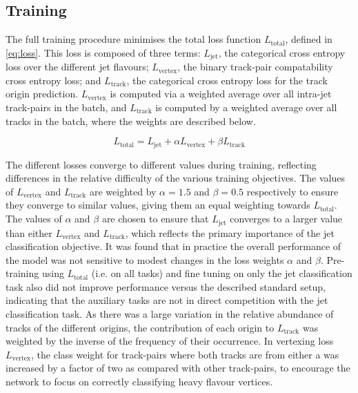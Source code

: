 \subsection{Training}\label{sec:training}

The full \GNN training procedure minimises the total loss function $L_\text{total}$, defined in \cref{eq:loss}. 
This loss is composed of three terms: $L_\text{jet}$, the categorical cross entropy loss over the different jet flavours; $L_\text{vertex}$, the binary track-pair compatability cross entropy loss; and $L_\text{track}$, the categorical cross entropy loss for the track origin prediction.
$L_\text{vertex}$ is computed via a weighted average over all intra-jet track-pairs in the batch, and $L_\text{track}$ is computed by a weighted average over all tracks in the batch, where the weights are described below.

\begin{equation}\label{eq:loss}
    L_\text{total} = L_\text{jet} + \alpha L_\text{vertex} + \beta L_\text{track}
\end{equation}

The different losses converge to different values during training, reflecting differences in the relative difficulty of the various training objectives.
The values of $L_\text{vertex}$ and $L_\text{track}$ are weighted by $\alpha = 1.5$ and $\beta = 0.5$ respectively to ensure they converge to similar values, giving them an equal weighting towards $L_\text{total}$. 
The values of $\alpha$ and $\beta$ are chosen to ensure that $L_\text{jet}$ converges to a larger value than either $L_\text{vertex}$ and $L_\text{track}$, which reflects the primary importance of the jet classification objective.
It was found that in practice the overall performance of the model was not sensitive to modest changes in the loss weights $\alpha$ and $\beta$.
Pre-training using $L_\text{total}$ (i.e. on all tasks) and fine tuning on only the jet classification task also did not improve performance versus the described standard setup, indicating that the auxiliary tasks are not in direct competition with the jet classification task.
As there was a large variation in the relative abundance of tracks of the different origins, the contribution of each origin to $L_\text{track}$ was weighted by the inverse of the frequency of their occurrence.
In vertexing loss $L_\text{vertex}$, the class weight for track-pairs where both tracks are from either a \borchadron was increased by a factor of two as compared with other track-pairs, to encourage the network to focus on correctly classifying heavy flavour vertices.

